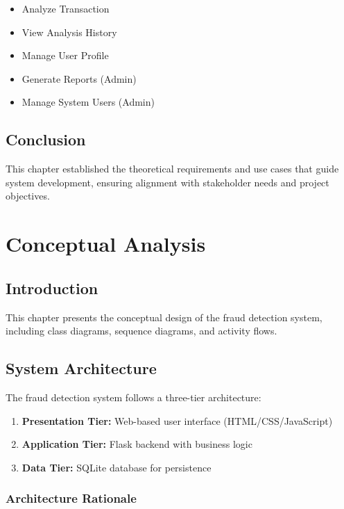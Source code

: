 \documentclass[12pt,a4paper,twoside]{report}
\begin{document}
\begin{itemize}
    \item Analyze Transaction
    \item View Analysis History
    \item Manage User Profile
    \item Generate Reports (Admin)
    \item Manage System Users (Admin)
\end{itemize}

\section{Conclusion}

This chapter established the theoretical requirements and use cases that guide system development, ensuring alignment with stakeholder needs and project objectives.

\chapter{Conceptual Analysis}

\section{Introduction}

This chapter presents the conceptual design of the fraud detection system, including class diagrams, sequence diagrams, and activity flows.

\section{System Architecture}

The fraud detection system follows a three-tier architecture:

\begin{enumerate}
    \item \textbf{Presentation Tier:} Web-based user interface (HTML/CSS/JavaScript)
    \item \textbf{Application Tier:} Flask backend with business logic
    \item \textbf{Data Tier:} SQLite database for persistence
\end{enumerate}

\subsection{Architecture Rationale}
\end{document}
